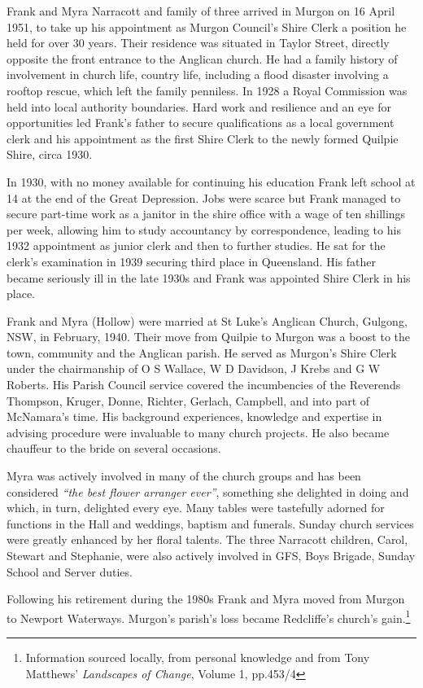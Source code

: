 Frank and Myra Narracott and family of three arrived in Murgon on 16 April 1951, to take up his appointment as Murgon Council's Shire Clerk a position he held for over 30 years. Their residence was situated in Taylor Street, directly opposite the front entrance to the Anglican church. He had a family history of involvement in church life, country life, including a flood disaster involving a rooftop rescue, which left the family penniless. In 1928 a Royal Commission was held into local authority boundaries. Hard work and resilience and an eye for opportunities led Frank's father to secure qualifications as a local government clerk and his appointment as the first Shire Clerk to the newly formed Quilpie Shire, circa 1930.

In 1930, with no money available for continuing his education Frank left school at 14 at the end of the Great Depression. Jobs were scarce but Frank managed to secure part-time work as a janitor in the shire office with a wage of ten shillings per week, allowing him to study accountancy by correspondence, leading to his 1932 appointment as junior clerk and then to further studies. He sat for the clerk's examination in 1939 securing third place in Queensland. His father became seriously ill in the late 1930s and Frank was appointed Shire Clerk in his place.

Frank and Myra (Hollow) were married at St Luke's Anglican Church, Gulgong, NSW, in February, 1940. Their move from Quilpie to Murgon was a boost to the town, community and the Anglican parish. He served as Murgon's Shire Clerk under the chairmanship of O S Wallace, W D Davidson, J Krebs and G W Roberts. His Parish Council service covered the incumbencies of the Reverends Thompson, Kruger, Donne, Richter, Gerlach, Campbell, and into part of McNamara's time. His background experiences, knowledge and expertise in advising procedure were invaluable to many church projects. He also became chauffeur to the bride on several occasions.

Myra was actively involved in many of the church groups and has been considered \emph{``the best flower arranger ever''}, something she delighted in doing and which, in turn, delighted every eye. Many tables were tastefully adorned for functions in the Hall and weddings, baptism and funerals. Sunday church services were greatly enhanced by her floral talents. The three Narracott children, Carol, Stewart and Stephanie, were also actively involved in GFS, Boys Brigade, Sunday School and Server duties.

Following his retirement during the 1980s Frank and Myra moved from Murgon to Newport Waterways. Murgon's parish's loss became Redcliffe's church's gain.\footnote{Information sourced locally, from personal knowledge and from Tony Matthews' \emph{Landscapes of Change}, Volume 1, pp.453/4}

